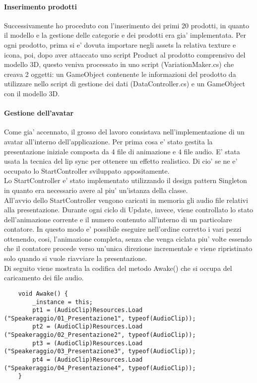 \paragraph{Inserimento prodotti}
Successivamente ho proceduto con l'inserimento dei primi 20 prodotti, in quanto il modello e la gestione delle categorie e dei prodotti era gia' implementata. Per ogni prodotto, prima si e' dovuta importare negli assets la relativa texture e icona, poi, dopo aver attaccato uno script Product al prodotto comprensivo del modello 3D, questo veniva processato in uno script (VariationMaker.cs) che creava 2 oggetti: un GameObject contenente le informazioni del prodotto da utilizzare nello script di gestione dei dati (DataController.cs) e un GameObject con il modello 3D.\\

\paragraph{Gestione dell'avatar}
Come gia' accennato, il grosso del lavoro consistava nell'implementazione di un avatar all'interno dell'applicazione. Per prima cosa e' stato gestita la presentazione iniziale composta da 4 file di animazione e 4 file audio. E' stata usata la tecnica del lip sync per ottenere un effetto realistico. Di cio' se ne e' occupato lo StartController sviluppato appositamente.\\
Lo StartController e' stato implementato utilizzando il design pattern Singleton in quanto era necessario avere al piu' un'istanza della classe.\\

All'avvio dello StartController vengono caricati in memoria gli audio file relativi alla presentazione. Durante ogni ciclo di Update, invece, viene controllato lo stato dell'animazione corrente e il numero contenuto all'interno di un particolare contatore. In questo modo e' possibile eseguire nell'ordine corretto i vari pezzi ottenendo, cosi, l'animazione completa, senza che venga ciclata piu' volte essendo che il contatore procede verso un'unica direzione incrementale e viene ripristinato solo quando si vuole riavviare la presentazione.\\

Di seguito viene mostrata la codifica del metodo Awake() che si occupa del caricamento dei file audio.
\begin{lstlisting}
	void Awake() {
		_instance = this;
		pt1 = (AudioClip)Resources.Load ("Speakeraggio/01_Presentazione1", typeof(AudioClip));
		pt2 = (AudioClip)Resources.Load ("Speakeraggio/02_Presentazione2", typeof(AudioClip));
		pt3 = (AudioClip)Resources.Load ("Speakeraggio/03_Presentazione3", typeof(AudioClip));
		pt4 = (AudioClip)Resources.Load ("Speakeraggio/04_Presentazione4", typeof(AudioClip));
	}
\end{lstlisting}

